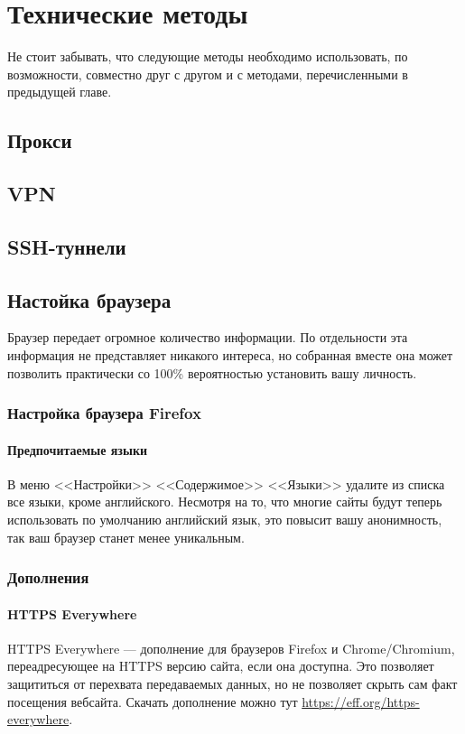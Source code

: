 \chapter{Технические методы}
\begin{important}
Не стоит забывать, что следующие методы необходимо использовать, по возможности, совместно друг с другом и с методами, перечисленными в предыдущей главе.
\end{important}
\section{Прокси}

\section{VPN}

\section{SSH-туннели}

\section{Настойка браузера}
\begin{important}
Браузер передает огромное количество информации. По отдельности эта информация не представляет никакого интереса, но собранная вместе она может позволить практически со 100\% вероятностью установить вашу личность.
\end{important}
\subsection{Настройка браузера Firefox}
\subsubsection{Предпочитаемые языки}
В меню <<Настройки>> \textrightarrow <<Содержимое>> \textrightarrow <<Языки>> удалите из списка все языки, кроме английского. Несмотря на то, что многие сайты будут теперь использовать по умолчанию английский язык, это повысит вашу анонимность, так ваш браузер станет менее уникальным.
\subsection{Дополнения}
\subsubsection{HTTPS Everywhere}
HTTPS Everywhere --- дополнение для браузеров Firefox и Chrome/Chromium, переадресующее на HTTPS версию сайта, если она доступна. Это позволяет защититься от перехвата передаваемых данных, но не позволяет скрыть сам факт посещения вебсайта. Скачать дополнение можно тут \url{https://eff.org/https-everywhere}.
